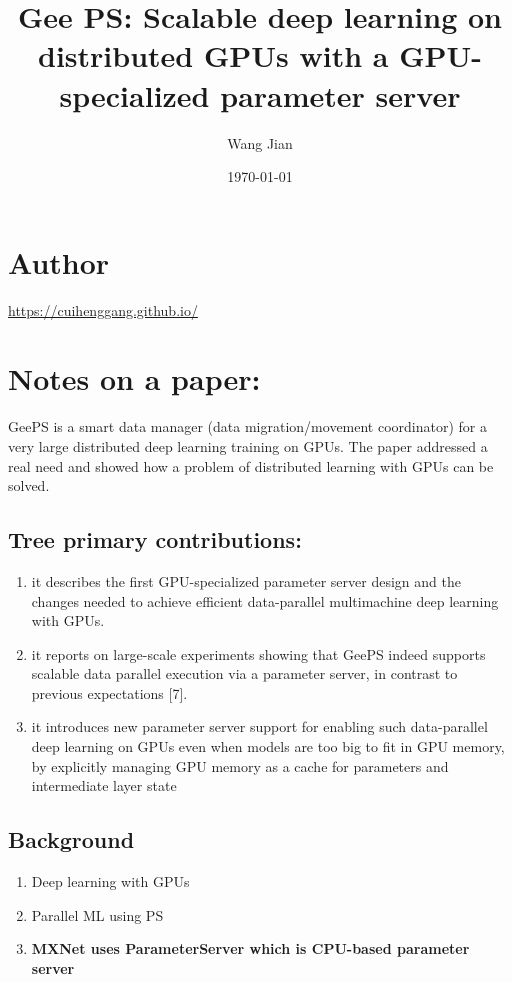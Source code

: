 \documentclass[11pt]{article}
\author{Wang Jian}
\date{\today}
\title{Gee PS: Scalable deep learning on distributed GPUs with a GPU-specialized parameter server}
\begin{document}
\maketitle
\tableofcontents

\section{Author}
\label{sec:org4817a46}
\url{https://cuihenggang.github.io/}

\section{Notes on a paper:}
\label{sec:orga8658d2}
GeePS is a smart data manager (data migration/movement coordinator) for a very large distributed deep learning training on GPUs. The paper addressed a real need and showed how a problem of distributed learning with GPUs can be solved.

\subsection{Tree primary contributions:}
\label{sec:org341cfb5}
\begin{enumerate}
\item it describes the first GPU-specialized parameter server design and the changes needed to achieve efficient data-parallel multimachine deep learning with GPUs.
\item it reports on large-scale experiments showing that GeePS indeed supports scalable data parallel execution via a parameter server, in contrast to previous expectations [7].
\item it introduces new parameter server support for enabling such data-parallel deep learning on GPUs even when models are too big to fit in GPU memory, by explicitly managing GPU memory as a cache for parameters and intermediate layer state
\end{enumerate}
\subsection{Background}
\label{sec:orgbae0c45}
\begin{enumerate}
\item Deep learning with GPUs
\item Parallel ML using PS
\item \textbf{MXNet uses ParameterServer which is CPU-based parameter server}
\end{enumerate}
\end{document}
